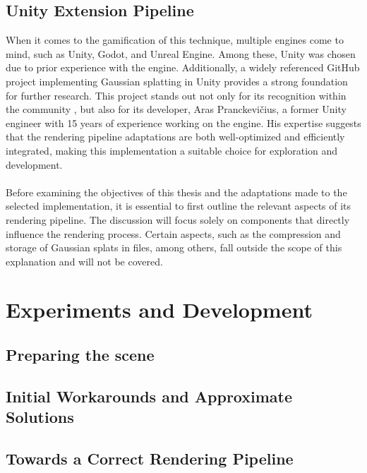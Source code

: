 \documentclass[12pt]{article}
\begin{document}
\subsection{Unity Extension Pipeline}
When it comes to the gamification of this technique, multiple engines come to mind, such as Unity, Godot, and Unreal Engine. Among these, Unity was chosen due to prior experience with the engine. Additionally, a widely referenced GitHub project \parencite{Aras} implementing Gaussian splatting in Unity provides a strong foundation for further research. This project stands out not only for its recognition within the community \parencite{ArasRecc1} \parencite{ArasRecc2}, but also for its developer, Aras Pranckevičius, a former Unity engineer with 15 years of experience working on the engine. His expertise suggests that the rendering pipeline adaptations are both well-optimized and efficiently integrated, making this implementation a suitable choice for exploration and development.
\\\\
Before examining the objectives of this thesis and the adaptations made to the selected implementation, it is essential to first outline the relevant aspects of its rendering pipeline. The discussion will focus solely on components that directly influence the rendering process. Certain aspects, such as the compression and storage of Gaussian splats in files, among others, fall outside the scope of this explanation and will not be covered.
\section{Experiments and Development}
\subsection{Preparing the scene}
\subsection{Initial Workarounds and Approximate Solutions}
\subsection{Towards a Correct Rendering Pipeline}

\printbibliography
\end{document}
